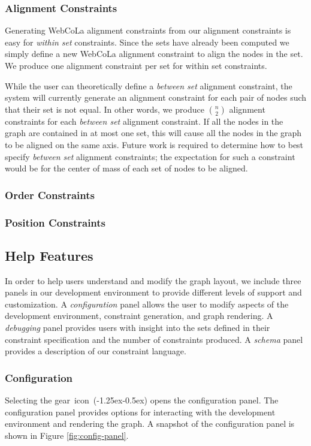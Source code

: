 \subsubsection{Alignment Constraints}
Generating WebCoLa alignment constraints from our alignment constraints is easy for \emph{within set} constraints. Since the sets have already been computed we simply define a new WebCoLa alignment constraint to align the nodes in the set.  We produce one alignment constraint per set for within set constraints.

While the user can theoretically define a \emph{between set} alignment constraint, the system will currently generate an alignment constraint for each pair of nodes such that their set is not equal. In other words, we produce ${n \choose 2}$ alignment constraints for each \emph{between set} alignment constraint. If all the nodes in the graph are contained in at most one set, this will cause all the nodes in the graph to be aligned on the same axis. Future work is required to determine how to best specify \emph{between set} alignment constraints; the expectation for such a constraint would be for the center of mass of each set of nodes to be aligned.

\subsubsection{Order Constraints}

\subsubsection{Position Constraints}

\subsection{Help Features}
In order to help users understand and modify the graph layout, we include three panels in our development environment to provide different levels of support and customization. A \emph{configuration} panel allows the user to modify aspects of the development environment, constraint generation, and graph rendering. A \emph{debugging} panel provides users with insight into the sets defined in their constraint specification and the number of constraints produced. A \emph{schema} panel provides a description of our constraint language.

\subsubsection{Configuration}
\configurationPanel
Selecting the \mbox{gear icon (\kern-1.25ex\kern-0.5ex)} opens the configuration panel. The configuration panel provides options for interacting with the development environment and rendering the graph. A snapshot of the configuration panel is shown in Figure \ref{fig:config-panel}.

